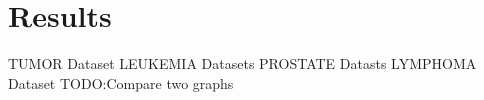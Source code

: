 \documentclass[serif]{beamer}
\begin{document}
	
	\section{Results}
	
	\begin{frame}[t]

		\begin{block}
		{
			\only<1-2>
			{
				TUMOR Dataset
			}
			\only<3-4>
			{
				LEUKEMIA Datasets
			}
			\only<5>
			{
				PROSTATE Datasts
			}
			\only<6>
			{
				LYMPHOMA Dataset
			}
		}
		{
			TODO:Compare two graphs
		}	
		\end{block}

		\begin{columns}
			\begin{column}{1.75in}
				\vspace{-1.00in}
				

\end{column}
\end{columns}
\end{frame}
\end{document}
